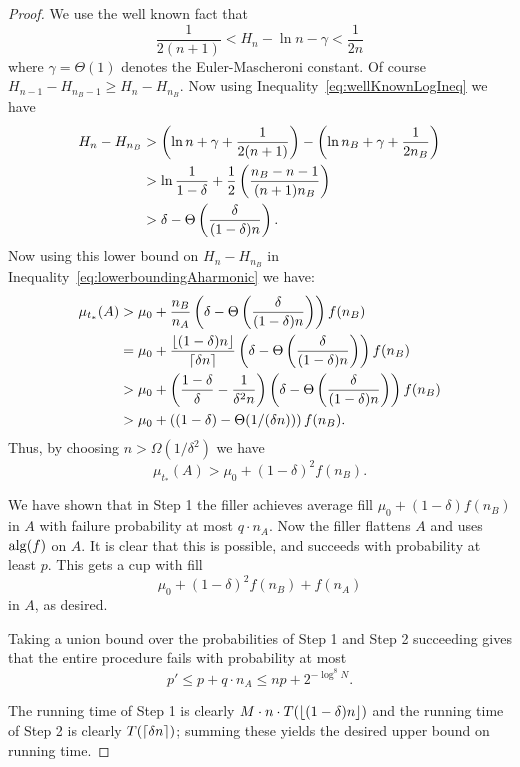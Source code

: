 \begin{proof}
  We use the well known fact that 
  \begin{equation}
    \label{eq:wellKnownLogIneq}
    \frac{1}{2(n+1)} < H_n - \ln n - \gamma < \frac{1}{2n}
  \end{equation}
  where $\gamma = \Theta(1)$ denotes the Euler-Mascheroni constant.
  Of course $H_{n-1}-H_{n_B-1} \ge H_n - H_{n_B}.$ Now using
  Inequality~\eqref{eq:wellKnownLogIneq} we have
  \begin{align*}
    H_n - H_{n_B} &> \left( \ln n + \gamma + \frac{1}{2(n+1)} \right) - \left( \ln n_B + \gamma + \frac{1}{2n_B} \right)\\
                  &> \ln \frac{1}{1-\delta} + \frac{1}{2}\left( \frac{n_B-n-1}{(n+1)n_B} \right)\\
                  &> \delta - \Theta\left( \frac{\delta}{(1-\delta)n} \right).
  \end{align*}
  Now using this lower bound on $H_n - H_{n_B}$ in
  Inequality~\eqref{eq:lowerboundingAharmonic} we have:
  \begin{align*}
    \mu_{t_*}(A) &> \mu_0 + \frac{n_B}{n_A}\left( \delta - \Theta\left( \frac{\delta}{(1-\delta)n} \right) \right)f(n_B)\\
                 &= \mu_0 + \frac{\left\lfloor (1-\delta)n \right\rfloor}{\left\lceil \delta n \right\rceil}\left( \delta - \Theta\left( \frac{\delta}{(1-\delta)n} \right) \right)f(n_B)\\
                 &> \mu_0 + \left( \frac{1-\delta}{\delta} - \frac{1}{\delta^2 n} \right)\left( \delta - \Theta\left( \frac{\delta}{(1-\delta)n} \right) \right)f(n_B)\\
                 &> \mu_0 + \left( (1-\delta) - \Theta(1/(\delta n)) \right)f(n_B).
  \end{align*}
  Thus, by choosing $n > \Omega(1/\delta^2)$ we have 
  $$\mu_{t_*}(A) > \mu_0 + (1-\delta)^2 f(n_B).$$

We have shown that in Step 1 the filler achieves average fill
$\mu_0 + (1-\delta)f(n_B)$ in $A$ with failure probability at
most $q\cdot n_A$.
Now the filler flattens $A$ and uses $\operatorname{\text{\textup{alg}}}(f)$ on $A$.
It is clear that this is possible, and succeeds with probability
at least $p$.
This gets a cup with fill 
$$\mu_0 + (1-\delta)^2 f(n_B) + f(n_A)$$
in $A$, as desired.

Taking a union bound over the probabilities of Step 1 and Step 2
succeeding gives that the entire procedure fails with probability
at most 
$$p' \le p + q \cdot n_A \le n p + 2^{-\log^8 N}.$$

The running time of Step 1 is clearly $M\cdot n\cdot
T(\left\lfloor (1-\delta)n \right\rfloor)$ and the running time of Step 2 is clearly
$T(\left\lceil \delta n \right\rceil)$; summing these yields the desired upper
bound on running time.

\end{proof}

